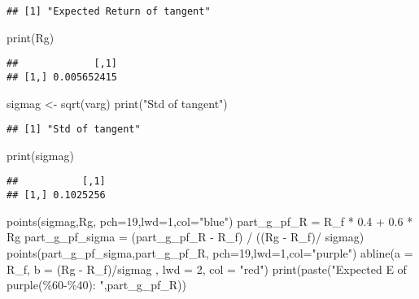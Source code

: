 \documentclass[
]{article}
\newenvironment{Shaded}{\begin{snugshade}}{\end{snugshade}}
\newcommand{\AttributeTok}[1]{\textcolor[rgb]{0.77,0.63,0.00}{#1}}
\newcommand{\DecValTok}[1]{\textcolor[rgb]{0.00,0.00,0.81}{#1}}
\newcommand{\FloatTok}[1]{\textcolor[rgb]{0.00,0.00,0.81}{#1}}
\newcommand{\FunctionTok}[1]{\textcolor[rgb]{0.00,0.00,0.00}{#1}}
\newcommand{\NormalTok}[1]{#1}
\newcommand{\OtherTok}[1]{\textcolor[rgb]{0.56,0.35,0.01}{#1}}
\newcommand{\SpecialCharTok}[1]{\textcolor[rgb]{0.00,0.00,0.00}{#1}}
\newcommand{\StringTok}[1]{\textcolor[rgb]{0.31,0.60,0.02}{#1}}
\begin{document}
\begin{verbatim}
## [1] "Expected Return of tangent"
\end{verbatim}

\begin{Shaded}
\begin{Highlighting}[]
\FunctionTok{print}\NormalTok{(Rg)}
\end{Highlighting}
\end{Shaded}

\begin{verbatim}
##             [,1]
## [1,] 0.005652415
\end{verbatim}

\begin{Shaded}
\begin{Highlighting}[]
\NormalTok{sigmag }\OtherTok{\textless{}{-}} \FunctionTok{sqrt}\NormalTok{(varg)}
\FunctionTok{print}\NormalTok{(}\StringTok{"Std of tangent"}\NormalTok{)}
\end{Highlighting}
\end{Shaded}

\begin{verbatim}
## [1] "Std of tangent"
\end{verbatim}

\begin{Shaded}
\begin{Highlighting}[]
\FunctionTok{print}\NormalTok{(sigmag)}
\end{Highlighting}
\end{Shaded}

\begin{verbatim}
##           [,1]
## [1,] 0.1025256
\end{verbatim}

\begin{Shaded}
\begin{Highlighting}[]
\FunctionTok{points}\NormalTok{(sigmag,Rg, }\AttributeTok{pch=}\DecValTok{19}\NormalTok{,}\AttributeTok{lwd=}\DecValTok{1}\NormalTok{,}\AttributeTok{col=}\StringTok{"blue"}\NormalTok{)}
\NormalTok{part\_g\_pf\_R }\OtherTok{=}\NormalTok{ R\_f }\SpecialCharTok{*} \FloatTok{0.4} \SpecialCharTok{+} \FloatTok{0.6} \SpecialCharTok{*}\NormalTok{ Rg}
\NormalTok{part\_g\_pf\_sigma }\OtherTok{=}\NormalTok{ (part\_g\_pf\_R }\SpecialCharTok{{-}}\NormalTok{ R\_f) }\SpecialCharTok{/}\NormalTok{ ((Rg }\SpecialCharTok{{-}}\NormalTok{ R\_f)}\SpecialCharTok{/}\NormalTok{ sigmag)}
\FunctionTok{points}\NormalTok{(part\_g\_pf\_sigma,part\_g\_pf\_R, }\AttributeTok{pch=}\DecValTok{19}\NormalTok{,}\AttributeTok{lwd=}\DecValTok{1}\NormalTok{,}\AttributeTok{col=}\StringTok{"purple"}\NormalTok{)}
\FunctionTok{abline}\NormalTok{(}\AttributeTok{a =}\NormalTok{ R\_f, }\AttributeTok{b =}\NormalTok{ (Rg }\SpecialCharTok{{-}}\NormalTok{ R\_f)}\SpecialCharTok{/}\NormalTok{sigmag , }\AttributeTok{lwd =} \DecValTok{2}\NormalTok{, }\AttributeTok{col =} \StringTok{"red"}\NormalTok{)}
\FunctionTok{print}\NormalTok{(}\FunctionTok{paste}\NormalTok{(}\StringTok{"Expected E of purple(\%60{-}\%40): "}\NormalTok{,part\_g\_pf\_R))}
\end{Highlighting}
\end{Shaded}
\end{document}
